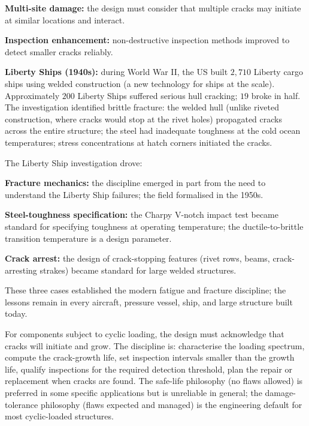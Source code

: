 \textbf{Multi-site damage:} the design must consider that multiple cracks may initiate at similar locations and interact.

\textbf{Inspection enhancement:} non-destructive inspection methods improved to detect smaller cracks reliably.

\textbf{Liberty Ships (1940s):} during World War II, the US built $2{,}710$ Liberty cargo ships using welded construction (a new technology for ships at the scale). Approximately $200$ Liberty Ships suffered serious hull cracking; $19$ broke in half. The investigation identified brittle fracture: the welded hull (unlike riveted construction, where cracks would stop at the rivet holes) propagated cracks across the entire structure; the steel had inadequate toughness at the cold ocean temperatures; stress concentrations at hatch corners initiated the cracks.

The Liberty Ship investigation drove:

\textbf{Fracture mechanics:} the discipline emerged in part from the need to understand the Liberty Ship failures; the field formalised in the 1950s.

\textbf{Steel-toughness specification:} the Charpy V-notch impact test became standard for specifying toughness at operating temperature; the ductile-to-brittle transition temperature is a design parameter.

\textbf{Crack arrest:} the design of crack-stopping features (rivet rows, beams, crack-arresting strakes) became standard for large welded structures.

These three cases established the modern fatigue and fracture discipline; the lessons remain in every aircraft, pressure vessel, ship, and large structure built today.

\begin{principle}
For components subject to cyclic loading, the design must acknowledge that cracks will initiate and grow. The discipline is: characterise the loading spectrum, compute the crack-growth life, set inspection intervals smaller than the growth life, qualify inspections for the required detection threshold, plan the repair or replacement when cracks are found. The safe-life philosophy (no flaws allowed) is preferred in some specific applications but is unreliable in general; the damage-tolerance philosophy (flaws expected and managed) is the engineering default for most cyclic-loaded structures.
\end{principle}

